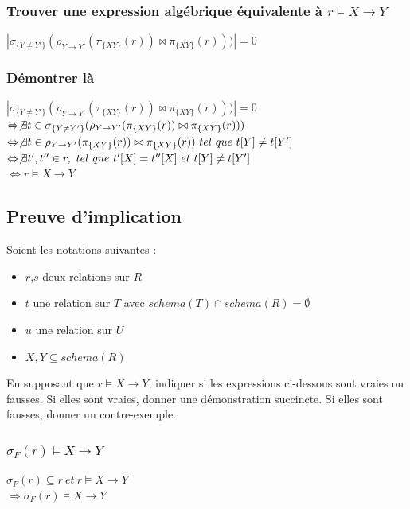 \documentclass[10pt,a4paper,twoside]{article}
\begin{document}
\subsubsection{Trouver une expression algébrique équivalente à $r \models X \rightarrow Y$}
$|\sigma_{\{Y\neq Y'\}}(\rho_{Y \rightarrow Y'}(\pi_{\{XY\}}(r)) \bowtie \pi_{\{XY\}}(r)))| = 0$\\
\subsubsection{Démontrer là}
$|\sigma_{\{Y\neq Y'\}}(\rho_{Y \rightarrow Y'}(\pi_{\{XY\}}(r)) \bowtie \pi_{\{XY\}}(r)))| = 0$\\
$\Leftrightarrow\not\exists t \in \sigma_{\{Y\neq Y'\}}(\rho_{Y \rightarrow Y'}(\pi_{\{XY\}}(r)) \bowtie \pi_{\{XY\}}(r)))$\\
$\Leftrightarrow \not\exists t\in \rho_{Y \rightarrow Y'}(\pi_{\{XY\}}(r)) \bowtie \pi_{\{XY\}}(r))\ tel\ que\ t[Y]\neq t[Y']$\\
$\Leftrightarrow \not\exists t',t'' \in r,\ tel\ que\ t'[X]=t''[X]\ et\ t[Y]\neq t[Y']$\\
$\Leftrightarrow r \models X \rightarrow Y$

\subsection{Preuve d'implication}
Soient les notations suivantes :
\begin{itemize}
\item $r$,$s$ deux relations sur $R$
\item $t$ une relation sur $T$ avec $schema(T) \cap schema(R) = \emptyset$
\item $u$ une relation sur $U$
\item $X,Y \subseteq schema(R)$
\end{itemize}
En supposant que $r \models X \rightarrow Y$, indiquer si les expressions ci-dessous sont vraies ou fausses. Si elles sont vraies, donner une démonstration succincte. Si elles sont fausses, donner un contre-exemple.

\subsubsection{$\sigma_{F}(r) \models X \rightarrow Y$}
$\sigma_{F}(r) \subseteq r\ et\ r \models X\rightarrow Y$\\
$\Rightarrow \sigma_{F}(r) \models X \rightarrow Y$
\end{document}

